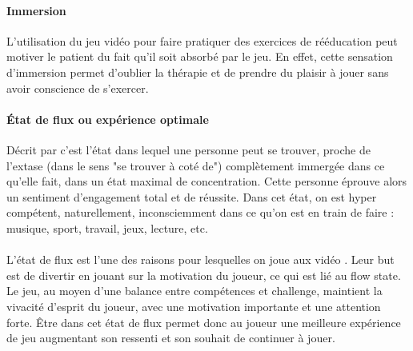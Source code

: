 \documentclass[french, 12pt]{article} %
\begin{document}
			\paragraph{Immersion\\}
L’utilisation du jeu vidéo pour faire pratiquer des exercices de rééducation peut motiver le patient du fait qu’il soit absorbé par le jeu. En effet, cette sensation d’immersion permet d’oublier la thérapie et de prendre du plaisir à jouer sans avoir conscience de s’exercer.			
			\paragraph{État de flux ou expérience optimale\\}
Décrit par \cite{Csik75} c'est l'état dans lequel une personne peut se trouver, proche de l'extase (dans le sens "se trouver à coté de") complètement immergée dans ce qu'elle fait, dans un état maximal de concentration. Cette personne éprouve alors un sentiment d'engagement total et de réussite. Dans cet état, on est hyper compétent, naturellement, inconsciemment dans ce qu'on est en train de faire : musique, sport, travail, jeux, lecture, etc. \paragraph{}
L'état de flux est l'une des raisons pour lesquelles on joue aux vidéo \cite{Murp11}. Leur but est de divertir en jouant sur la motivation du joueur, ce qui est lié au flow state. Le jeu, au moyen d'une balance entre compétences et challenge, maintient la vivacité d'esprit du joueur, avec une motivation importante et une attention forte\cite{Rutl12}. Être dans cet état de flux permet donc au joueur une meilleure expérience de jeu augmentant son ressenti et son souhait de continuer à jouer\cite{Chen07}.

			
\end{document}

